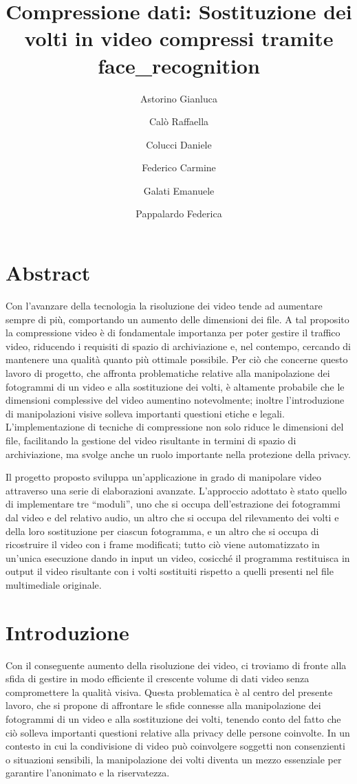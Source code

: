 \documentclass{report}
\title{Compressione dati: Sostituzione dei volti in video compressi tramite face\_recognition}
\author{Astorino Gianluca \and Calò Raffaella \and  Colucci Daniele \and  Federico Carmine \and Galati Emanuele \and Pappalardo Federica}
\begin{document}
\maketitle

\thispagestyle{empty}
\thispagestyle{empty}
\chapter*{Abstract}
Con l’avanzare della tecnologia la risoluzione dei video tende ad aumentare sempre di più, comportando un aumento delle dimensioni dei file. A tal proposito la compressione video è di fondamentale importanza per poter gestire il traffico video, riducendo i requisiti di spazio di archiviazione e, nel contempo, cercando di mantenere una qualità quanto più ottimale possibile. Per ciò che concerne questo lavoro di progetto, che affronta problematiche relative alla manipolazione dei fotogrammi di un video e alla sostituzione dei volti, è altamente probabile che le dimensioni complessive del video aumentino notevolmente; inoltre l’introduzione di manipolazioni visive solleva importanti questioni etiche e legali. L’implementazione di tecniche di compressione non solo riduce le dimensioni del file, facilitando la gestione del video risultante in termini di spazio di archiviazione, ma svolge anche un ruolo importante nella protezione della privacy.

Il progetto proposto sviluppa un’applicazione in grado di manipolare video attraverso una serie di elaborazioni avanzate. L’approccio adottato è stato quello di implementare tre “moduli”, uno che si occupa dell’estrazione dei fotogrammi dal video e del relativo audio, un altro che si occupa del rilevamento dei volti e della loro sostituzione per ciascun fotogramma, e un altro che si occupa di ricostruire il video con i frame modificati; tutto ciò viene automatizzato in un’unica esecuzione dando in input un video, cosicché il programma restituisca in output il video risultante con i volti sostituiti rispetto a quelli presenti nel file multimediale originale.


\thispagestyle{empty}
\tableofcontents
\thispagestyle{empty}

\chapter{Introduzione}

Con il conseguente aumento della risoluzione dei video, ci troviamo di fronte alla sfida di gestire in modo efficiente il crescente volume di dati video senza compromettere la qualità visiva. Questa problematica è al centro del presente lavoro, che si propone di affrontare le sfide connesse alla manipolazione dei fotogrammi di un video e alla sostituzione dei volti, tenendo conto del fatto che ciò solleva importanti questioni relative alla privacy delle persone coinvolte. In un contesto in cui la condivisione di video può coinvolgere soggetti non consenzienti o situazioni sensibili, la manipolazione dei volti diventa un mezzo essenziale per garantire l’anonimato e la riservatezza.
\end{document}
